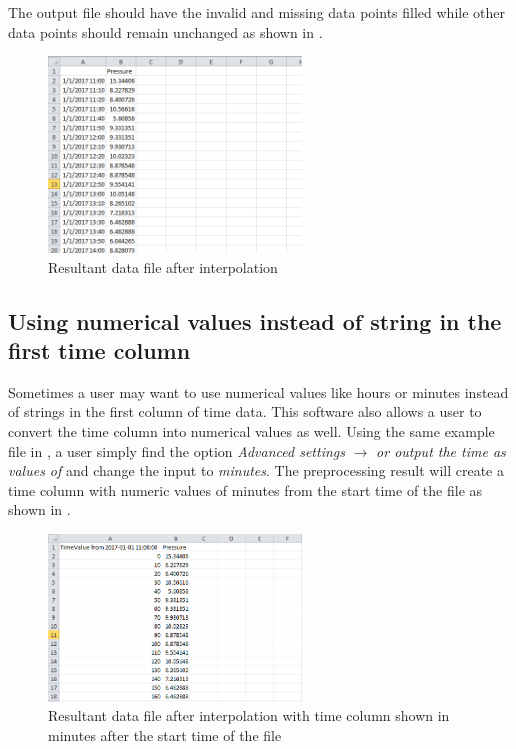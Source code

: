 \documentclass[12pt,a4paper]{article}
\begin{document}
The output file should have the invalid and missing data points filled while other data points should remain unchanged as shown in .

\begin{figure}[H]
\centering
\includegraphics[width=0.6\textwidth]{missing_data_result.png}
\caption{Resultant data file after interpolation}
\label{fig:missing_data_result}
\end{figure}

\subsection{Using numerical values instead of string in the first time column}
Sometimes a user may want to use numerical values like hours or minutes instead of strings in the first column of time data.
This software also allows a user to convert the time column into numerical values as well.
Using the same example file in , a user simply find the option \emph{Advanced settings} $\rightarrow$ \emph{or output the time as values of} and change the input to \emph{minutes}.
The preprocessing result will create a time column with numeric values of minutes from the start time of the file as shown in .

\begin{figure}[H]
\centering
\includegraphics[width=0.6\textwidth]{missing_data_result_minute.png}
\caption{Resultant data file after interpolation with time column shown in minutes after the start time of the file}
\label{fig:minute_data}
\end{figure}
\end{document}
